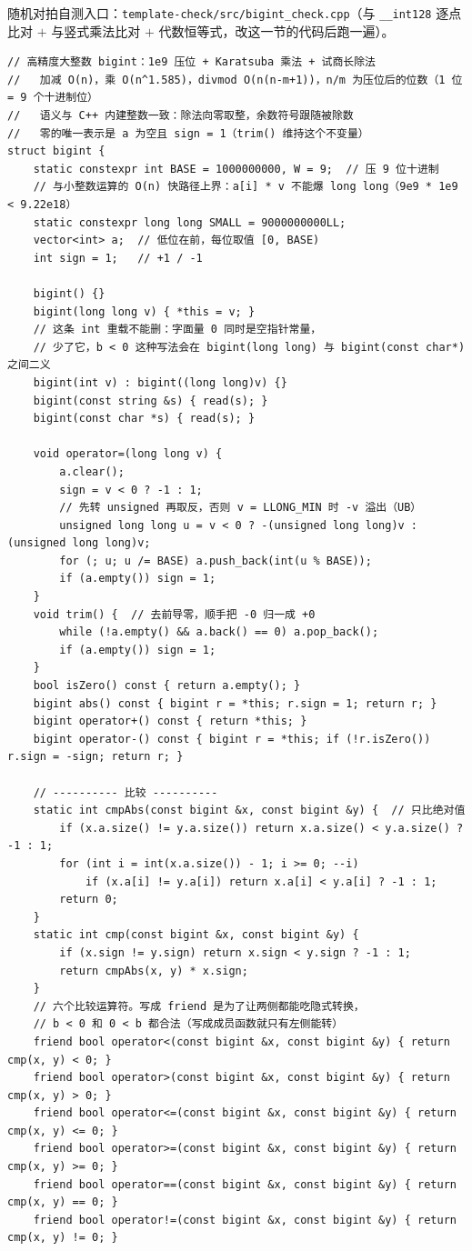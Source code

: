 		随机对拍自测入口：\texttt{template-check/src/\allowbreak bigint\_check.cpp}（与 \texttt{\_\_int128} 逐点比对 $+$ 与竖式乘法比对 $+$ 代数恒等式，改这一节的代码后跑一遍）。

		\begin{verbatim}
// 高精度大整数 bigint：1e9 压位 + Karatsuba 乘法 + 试商长除法
//   加减 O(n)，乘 O(n^1.585)，divmod O(n(n-m+1))，n/m 为压位后的位数（1 位 = 9 个十进制位）
//   语义与 C++ 内建整数一致：除法向零取整，余数符号跟随被除数
//   零的唯一表示是 a 为空且 sign = 1（trim() 维持这个不变量）
struct bigint {
    static constexpr int BASE = 1000000000, W = 9;  // 压 9 位十进制
    // 与小整数运算的 O(n) 快路径上界：a[i] * v 不能爆 long long（9e9 * 1e9 < 9.22e18）
    static constexpr long long SMALL = 9000000000LL;
    vector<int> a;  // 低位在前，每位取值 [0, BASE)
    int sign = 1;   // +1 / -1

    bigint() {}
    bigint(long long v) { *this = v; }
    // 这条 int 重载不能删：字面量 0 同时是空指针常量，
    // 少了它，b < 0 这种写法会在 bigint(long long) 与 bigint(const char*) 之间二义
    bigint(int v) : bigint((long long)v) {}
    bigint(const string &s) { read(s); }
    bigint(const char *s) { read(s); }

    void operator=(long long v) {
        a.clear();
        sign = v < 0 ? -1 : 1;
        // 先转 unsigned 再取反，否则 v = LLONG_MIN 时 -v 溢出（UB）
        unsigned long long u = v < 0 ? -(unsigned long long)v : (unsigned long long)v;
        for (; u; u /= BASE) a.push_back(int(u % BASE));
        if (a.empty()) sign = 1;
    }
    void trim() {  // 去前导零，顺手把 -0 归一成 +0
        while (!a.empty() && a.back() == 0) a.pop_back();
        if (a.empty()) sign = 1;
    }
    bool isZero() const { return a.empty(); }
    bigint abs() const { bigint r = *this; r.sign = 1; return r; }
    bigint operator+() const { return *this; }
    bigint operator-() const { bigint r = *this; if (!r.isZero()) r.sign = -sign; return r; }

    // ---------- 比较 ----------
    static int cmpAbs(const bigint &x, const bigint &y) {  // 只比绝对值
        if (x.a.size() != y.a.size()) return x.a.size() < y.a.size() ? -1 : 1;
        for (int i = int(x.a.size()) - 1; i >= 0; --i)
            if (x.a[i] != y.a[i]) return x.a[i] < y.a[i] ? -1 : 1;
        return 0;
    }
    static int cmp(const bigint &x, const bigint &y) {
        if (x.sign != y.sign) return x.sign < y.sign ? -1 : 1;
        return cmpAbs(x, y) * x.sign;
    }
    // 六个比较运算符。写成 friend 是为了让两侧都能吃隐式转换，
    // b < 0 和 0 < b 都合法（写成成员函数就只有左侧能转）
    friend bool operator<(const bigint &x, const bigint &y) { return cmp(x, y) < 0; }
    friend bool operator>(const bigint &x, const bigint &y) { return cmp(x, y) > 0; }
    friend bool operator<=(const bigint &x, const bigint &y) { return cmp(x, y) <= 0; }
    friend bool operator>=(const bigint &x, const bigint &y) { return cmp(x, y) >= 0; }
    friend bool operator==(const bigint &x, const bigint &y) { return cmp(x, y) == 0; }
    friend bool operator!=(const bigint &x, const bigint &y) { return cmp(x, y) != 0; }


\end{verbatim}
